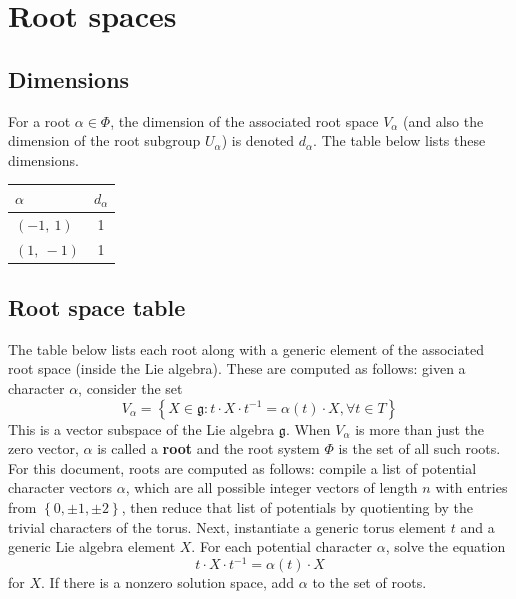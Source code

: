 \documentclass[11pt]{article}
\newcommand{\noi}{\noindent}
\newcommand{\tbf}{\textbf}
\newcommand{\inv}{^{-1}}
\newcommand{\lb}{\left\{}
\newcommand{\rb}{\right\}}
\newcommand{\frakg}{\mathfrak{g}}
\theoremstyle{definition}
\begin{document}
\newpage
\section{Root spaces}

\subsection{Dimensions}

For a root $\alpha \in \Phi$, the dimension of the associated root space $V_\alpha$ (and also the dimension of the root subgroup $U_\alpha$) is denoted $d_\alpha$. The table below lists these dimensions.

\bigskip

\noindent \begin{tabular}{|l|c|}
    \hline
    \textbf{$\alpha$} & \textbf{$d_{\alpha}$} \\
    \hline
    $\left( -1, \  1\right)$ & 1 \\
    \hline
    $\left( 1, \  -1\right)$ & 1 \\
    \hline
\end{tabular}


\subsection{Root space table}

\noi The table below lists each root along with a generic element of the associated root space (inside the Lie algebra). These are computed as follows: given a character $\alpha$, consider the set
\[
	V_\alpha = \lb X \in \frakg : t \cdot X \cdot t \inv = \alpha(t) \cdot X, \forall t \in T \rb
\]
This is a vector subspace of the Lie algebra $\frakg$. When $V_\alpha$ is more than just the zero vector, $\alpha$ is called a \tbf{root} and the root system $\Phi$ is the set of all such roots. For this document, roots are computed as follows: compile a list of potential character vectors $\alpha$, which are all possible integer vectors of length $n$ with entries from $\lb 0, \pm 1, \pm 2 \rb$, then reduce that list of potentials by quotienting by the trivial characters of the torus. Next, instantiate a generic torus element $t$ and a generic Lie algebra element $X$. For each potential character $\alpha$, solve the equation
\[
	t \cdot X \cdot t \inv = \alpha(t) \cdot X
\]
for $X$. If there is a nonzero solution space, add $\alpha$ to the set of roots.

\bigskip
\end{document}
